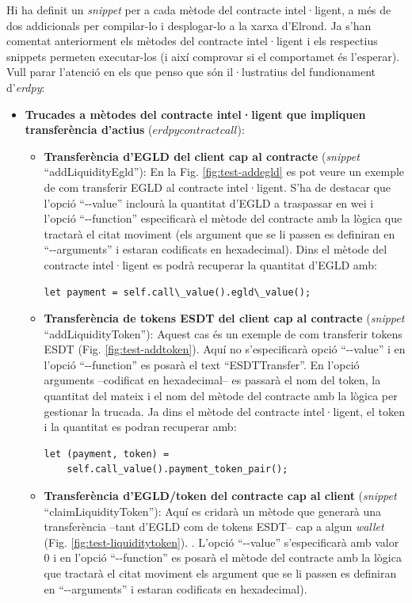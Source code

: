 \documentclass[11pt,a4paper]{article}
\begin{document}
Hi ha definit un \textit{snippet} per a cada mètode del contracte intel·ligent, a més de dos addicionals per compilar-lo i desplogar-lo a la xarxa d'Elrond. Ja s'han comentat anteriorment els mètodes del contracte intel·ligent i els respectius snippets permeten executar-los (i així comprovar si el comportamet és l'esperar). Vull parar l'atenció en els que penso que són il·lustratius del fundionament d'\textit{erdpy}:
\begin{itemize}
\item \textbf{Trucades a mètodes del contracte intel·ligent que impliquen transferència d'actius} (\(erdpy contract call\)):
	\begin{itemize}
	\item \textbf{Transferència d'EGLD del client cap al contracte} (\textit{snippet} ``addLiquidityEgld''): En la Fig. \ref{fig:test-addegld} es pot veure un exemple de com transferir EGLD al contracte intel·ligent. S'ha de destacar que l'opció ``-{}-value'' inclourà la quantitat d'EGLD a traspassar en wei i l'opció ``-{}-function'' especificarà el mètode del contracte amb la lògica que tractarà el citat moviment (els argument que se li passen es definiran en ``-{}-arguments'' i estaran codificats en hexadecimal). Dins el mètode del contracte intel·ligent es podrà recuperar la quantitat d'EGLD amb:
\begin{lstlisting}
let payment = self.call\_value().egld\_value();
\end{lstlisting}
		\item \textbf{Transferència de tokens ESDT del client cap al contracte} (\textit{snippet} ``addLiquidityToken''): Aquest cas és un exemple de com transferir tokens ESDT (Fig. \ref{fig:test-addtoken}). Aquí no s'especificarà opció ``-{}-value'' i en l'opció ``-{}-function'' es posarà el text ``ESDTTransfer''. En l'opció arguments –codificat en hexadecimal– es passarà el nom del token, la quantitat del mateix i el nom del mètode del contracte amb la lògica per gestionar la trucada. Ja dins el mètode del contracte intel·ligent, el token i la quantitat es podran recuperar amb:
\begin{lstlisting}
let (payment, token) =
	self.call_value().payment_token_pair();
\end{lstlisting}
		\item \textbf{Transferència d'EGLD/token del contracte cap al client} (\textit{snippet} ``claimLiquidityToken''): Aquí es cridarà un mètode que generarà una transferència –tant d'EGLD com de tokens ESDT– cap a algun \textit{wallet} (Fig. \ref{fig:test-liquiditytoken}). . L'opció ``-{}-value'' s'especificarà amb valor 0 i en l'opció ``-{}-function'' es posarà el mètode del contracte amb la lògica que tractarà el citat moviment els argument que se li passen es definiran en ``-{}-arguments'' i estaran codificats en hexadecimal).

\end{itemize}
\end{itemize}
\end{document}
